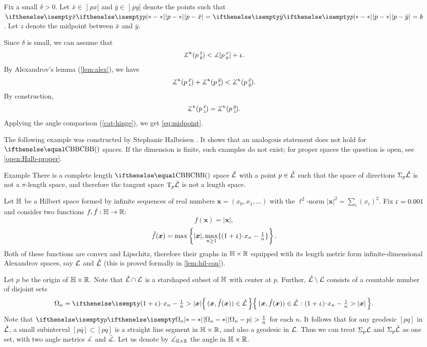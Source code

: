 Fix a small $\delta>0$.
Let $\bar x\in \mathopen{]}px]$ and $\bar y\in \mathopen{]}py]$ denote the points such that 
$\dist{p}{\bar x}{}=\dist{p}{\bar y}{}=\delta$.
Let $z$ denote the midpoint between $\bar x$ and $\bar y$.

Since $\delta$ is small, we can assume that 
\[\angk\kappa p{\bar x}{\bar y}<\mangle \hinge pxy+\eps.\]
By  Alexandrov's lemma (\ref{lem:alex}), we have
\[\angk\kappa p{\bar x}{z}+\angk\kappa p{\bar y}{z}< \angk\kappa p{\bar x}{\bar y}.\]
By construction,
\[\angk\kappa p{\bar x}{z}=\angk\kappa p{\bar y}{z}.\]
Applying the angle comparison (\ref{cat-hinge}), we get \ref{eq:midpoint}.
\qeds

The following example was constructed by Stephanie Halbeisen \cite{halbeisen}.
It shows that an analogous statement does not hold for $\Alex{}$ spaces.
If the dimension is finite, such examples do not exist; %
for proper spaces the question is open, see \ref{open:Halb-proper}.

\begin{thm}{Example}\label{Halbeisen's example}
There is a complete length $\Alex{}$ space $\check{\mathcal{L}}$
with a point $p\in\check{\spc{L}}$ such that the space of directions $\Sigma_p\check{\mathcal{L}}$ is not a $\pi$-length space, and therefore the tangent space $\text{\rm T}_p\check{\mathcal{L}}$ is not a length space. 
\end{thm}



Let $\mathbb{H}$ be a Hilbert space formed by infinite sequences of real numbers $\bm{x}=(x_0,x_1,\dots)$ with the $\ell^2$-norm
$|\bm{x}|^2=\sum_i(x_i)^2$. 
Fix $\upvarepsilon=0.001$ and consider two functions $f,\check f:\HH\to\RR$:
\[f(\bm{x})=|\bm{x}|,\]
\[\check f(\bm{x})
=
\max\left\{|\bm{x}|,\max_{n\ge1}\{(1+\eps)\cdot x_n-\tfrac{1}{n}\}\right\}.\] 
Both of these functions are convex and Lipschitz, therefore their graphs in $\HH\times \RR$ equipped with its length metric form infinite-dimensional Alexandrov spaces, say $\mathcal{L}$  and $\check{\mathcal{L}}$ (this is proved formally in \ref{lem:hil-con}).

Let $p$ be the origin of $\HH\times \RR$.
Note that $\check{\spc{L}}\cap\spc{L}$ is a starshaped subset of $\mathbb{H}$ with center at $p$.
Further, $\check{\mathcal{L}}\setminus\mathcal{L}$ consists of a countable number of disjoint sets
\[\Omega_n=\set{(\bm{x},\check f(\bm{x}))\in\check{\spc{L}}}{(1+\eps)\cdot x_n-\tfrac{1}{n}>|\bm{x}|}.\]
Note that $\dist{\Omega_n}{p}{}>\tfrac{1}{n}$ for each $n$.
It follows that for any geodesic $[p q]$ in $\check{\mathcal{L}}$,
a small subinterval $[p \bar q]\subset [p q]$ 
is a straight line segment in $\HH\times\RR$, 
and also a geodesic in $\mathcal{L}$.
Thus we can treat $\Sigma_p\mathcal{L}$ and $\Sigma_p\check{\mathcal{L}}$ as one set, with two angle metrics $\measuredangle$ and $\check{\measuredangle}$.
Let us denote by $\mangle_{\HH\times \RR}$ the angle in $\HH\times\RR$.

